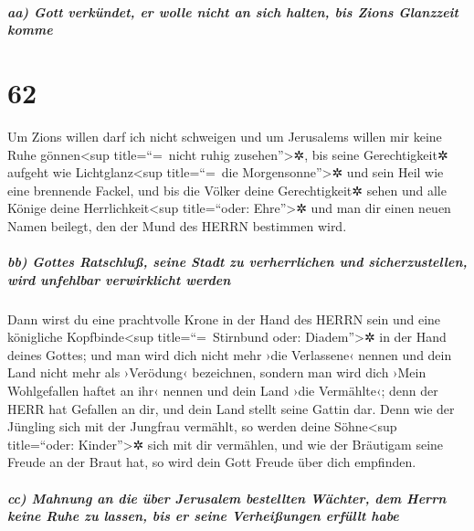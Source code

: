 \hypertarget{aa-gott-verkuxfcndet-er-wolle-nicht-an-sich-halten-bis-zions-glanzzeit-komme}{%
\subparagraph{aa) Gott verkündet, er wolle nicht an sich halten, bis
Zions Glanzzeit
komme}\label{aa-gott-verkuxfcndet-er-wolle-nicht-an-sich-halten-bis-zions-glanzzeit-komme}}

\hypertarget{section-61}{%
\section{62}\label{section-61}}

Um Zions willen darf ich nicht schweigen und um Jerusalems
willen mir keine Ruhe gönnen\textless sup title=``=~nicht ruhig
zusehen''\textgreater✲, bis seine Gerechtigkeit✲ aufgeht wie
Lichtglanz\textless sup title=``=~die Morgensonne''\textgreater✲ und
sein Heil wie eine brennende Fackel, und bis die Völker
deine Gerechtigkeit✲ sehen und alle Könige deine
Herrlichkeit\textless sup title=``oder: Ehre''\textgreater✲ und man dir
einen neuen Namen beilegt, den der Mund des HERRN bestimmen wird.

\hypertarget{bb-gottes-ratschluuxdf-seine-stadt-zu-verherrlichen-und-sicherzustellen-wird-unfehlbar-verwirklicht-werden}{%
\subparagraph{bb) Gottes Ratschluß, seine Stadt zu verherrlichen und
sicherzustellen, wird unfehlbar verwirklicht
werden}\label{bb-gottes-ratschluuxdf-seine-stadt-zu-verherrlichen-und-sicherzustellen-wird-unfehlbar-verwirklicht-werden}}

Dann wirst du eine prachtvolle Krone in der Hand des HERRN
sein und eine königliche Kopfbinde\textless sup title=``=~Stirnbund
oder: Diadem''\textgreater✲ in der Hand deines Gottes; und
man wird dich nicht mehr ›die Verlassene‹ nennen und dein Land nicht
mehr als ›Verödung‹ bezeichnen, sondern man wird dich ›Mein Wohlgefallen
haftet an ihr‹ nennen und dein Land ›die Vermählte‹; denn der HERR hat
Gefallen an dir, und dein Land stellt seine Gattin dar.
Denn wie der Jüngling sich mit der Jungfrau vermählt, so
werden deine Söhne\textless sup title=``oder: Kinder''\textgreater✲ sich
mit dir vermählen, und wie der Bräutigam seine Freude an der Braut hat,
so wird dein Gott Freude über dich empfinden.

\hypertarget{cc-mahnung-an-die-uxfcber-jerusalem-bestellten-wuxe4chter-dem-herrn-keine-ruhe-zu-lassen-bis-er-seine-verheiuxdfungen-erfuxfcllt-habe}{%
\subparagraph{cc) Mahnung an die über Jerusalem bestellten Wächter, dem
Herrn keine Ruhe zu lassen, bis er seine Verheißungen erfüllt
habe}\label{cc-mahnung-an-die-uxfcber-jerusalem-bestellten-wuxe4chter-dem-herrn-keine-ruhe-zu-lassen-bis-er-seine-verheiuxdfungen-erfuxfcllt-habe}}

